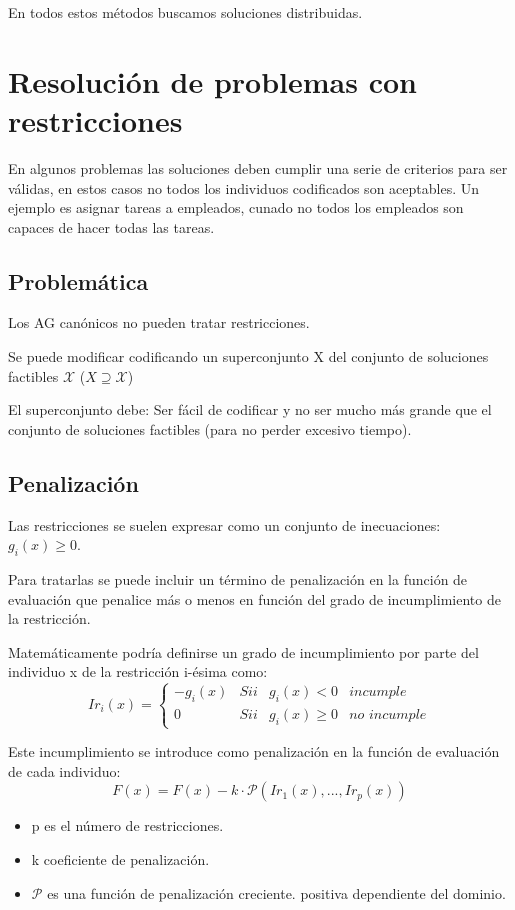 \documentclass[12pt, twoside, openright]{report} %
\begin{document}
En todos estos métodos buscamos soluciones distribuidas.

\section{Resolución de problemas con restricciones}
En algunos problemas las soluciones deben cumplir una serie de criterios para ser válidas, en estos casos no todos los individuos codificados son aceptables. Un ejemplo es asignar tareas a empleados, cunado no todos los empleados son capaces de hacer todas las tareas.

\subsection{Problemática}
Los AG canónicos no pueden tratar restricciones.

Se puede modificar codificando un superconjunto X del conjunto de soluciones factibles $\mathcal{X}$ ($X \supseteq \mathcal{X}$)

El superconjunto debe: Ser fácil de codificar y no ser mucho más grande que el conjunto de soluciones factibles (para no perder excesivo tiempo).

\subsection{Penalización}
Las restricciones se suelen expresar como un conjunto de inecuaciones: $g_i(x) \geq 0$.

Para tratarlas se puede incluir un término de penalización en la función de evaluación que penalice más o menos en función del grado de incumplimiento de la restricción.

Matemáticamente podría definirse un grado de incumplimiento por parte del individuo x de la restricción i-ésima como:
$$Ir_i(x) = \left\{ \begin{array}{clll}
	-g_i(x) &  Sii & g_i(x)<0 & \textit{incumple} \\
	0 &  Sii & g_i(x)\geq 0 & \textit{no incumple}
\end{array} \right.$$

Este incumplimiento se introduce como penalización en la función de evaluación de cada individuo: 
$$F(x)=F(x)-k\cdot \mathcal{P}(Ir_1(x), ..., Ir_p(x))$$
\begin{itemize}
	\item p es el número de restricciones.
	\item k coeficiente de penalización.
	\item $\mathcal{P}$ es una función de penalización creciente.
	positiva dependiente del dominio.
\end{itemize}
\pagebreak
\end{document}
